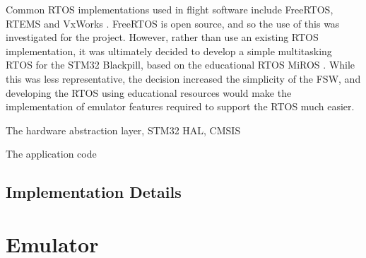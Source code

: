 \documentclass[../report.tex]{subfiles}
\begin{document}
Common RTOS implementations used in flight software include FreeRTOS, RTEMS and
VxWorks \citep{Cratere_2024}. FreeRTOS is open source, and so the use of this
was investigated for the project. However, rather than use an existing RTOS
implementation, it was ultimately decided to develop a simple multitasking RTOS
for the STM32 Blackpill, based on the educational RTOS MiROS \citep{miros}.
While this was less representative, the decision increased the simplicity of
the FSW, and developing the RTOS using educational resources would make the
implementation of emulator features required to support the RTOS much easier.

The hardware abstraction layer, STM32 HAL, CMSIS

The application code


\subsection{Implementation Details}








\section{Emulator}

\end{document}
